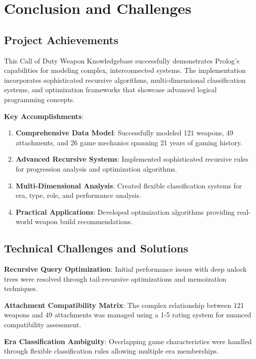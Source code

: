 \documentclass[12pt,a4paper]{article}
\begin{document}
\section{Conclusion and Challenges}

\subsection{Project Achievements}

This Call of Duty Weapon Knowledgebase successfully demonstrates Prolog's
capabilities for modeling complex, interconnected systems. The implementation
incorporates sophisticated recursive algorithms, multi-dimensional
classification systems, and optimization frameworks that showcase advanced
logical programming concepts.

\textbf{Key Accomplishments}:
\begin{enumerate}
    \item \textbf{Comprehensive Data Model}: Successfully modeled 121 weapons, 49 attachments, and 26 game mechanics spanning 21 years of gaming history.
    \item \textbf{Advanced Recursive Systems}: Implemented sophisticated recursive rules for progression analysis and optimization algorithms.
    \item \textbf{Multi-Dimensional Analysis}: Created flexible classification systems for era, type, role, and performance analysis.
    \item \textbf{Practical Applications}: Developed optimization algorithms providing real-world weapon build recommendations.
\end{enumerate}

\subsection{Technical Challenges and Solutions}

\textbf{Recursive Query Optimization}: Initial performance issues with deep unlock trees were resolved through tail-recursive optimizations and memoization techniques.

\textbf{Attachment Compatibility Matrix}: The complex relationship between 121 weapons and 49 attachments was managed using a 1-5 rating system for nuanced compatibility assessment.

\textbf{Era Classification Ambiguity}: Overlapping game characteristics were handled through flexible classification rules allowing multiple era memberships.
\end{document}
